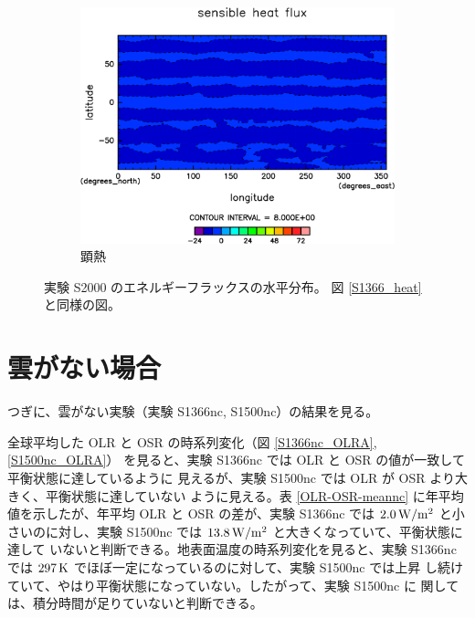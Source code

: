\documentclass[body]{subfiles}
\begin{document}
\begin{figure}[t]
\begin{subfigure}{.4\textwidth}
		\includegraphics[width=\textwidth]{S2000/Sens,time=7300:7665-crop-rotate.pdf}
		\caption{顕熱\hmu*{[W/m^{-2}]}}\label{S2000顕熱}
	\end{subfigure}
	\caption[実験 S2000 のエネルギーフラックスの水平分布]{
		実験 S2000 のエネルギーフラックスの水平分布。
		図 \ref{S1366_heat} と同様の図。
	}\label{S2000_heat}
\end{figure}

\afterpage{\clearpage}

\section{雲がない場合}

つぎに、雲がない実験（実験 S1366nc, S1500nc）の結果を見る。

全球平均した OLR と OSR の時系列変化（図 \ref{S1366nc_OLRA}, \ref{S1500nc_OLRA}）
を見ると、実験 S1366nc では OLR と OSR の値が一致して平衡状態に達しているように
見えるが、実験 S1500nc では OLR が OSR より大きく、平衡状態に達していない
ように見える。表 \ref{OLR-OSR-meannc} に年平均値を示したが、年平均 OLR と
OSR の差が、実験 S1366nc では \(2.0\hmu{W/m^2}\) と小さいのに対し、実験
S1500nc では \(13.8\hmu{W/m^2}\) と大きくなっていて、平衡状態に達して
いないと判断できる。地表面温度の時系列変化を見ると、実験 S1366nc では
\(297\hmu{K}\) でほぼ一定になっているのに対して、実験 S1500nc では上昇
し続けていて、やはり平衡状態になっていない。したがって、実験 S1500nc に
関しては、積分時間が足りていないと判断できる。
\end{document}
